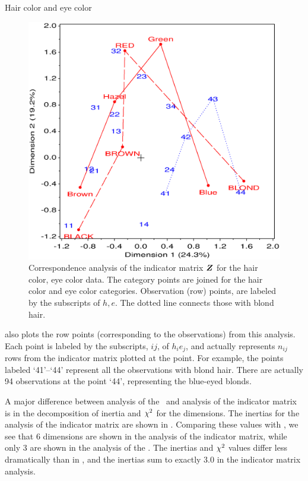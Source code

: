 \begin{Example}[haireye4]{Hair color and eye color}
\begin{figure}[htb]
  \centering
  \includegraphics[scale=.7,clip]{ch5/fig/mcahair}
  \caption[Correspondence
  analysis of the indicator matrix Z for the hair color, eye color data]{Correspondence
  analysis of the indicator matrix $\bm{Z}$ for the hair color, eye color data.
  The category points are joined for the hair color and eye color categories.
  Observation (row) points, are labeled by the subscripts of $h, e$.
  The dotted line connects those with blond hair.}%
  \label{fig:mcahair}
\end{figure}

 also plots the row points (corresponding to the observations) from this analysis.  Each point is labeled by the subscripts,
$ij$, of $h_i e_j$, and actually represents $n_{ij}$ rows
from the indicator matrix
plotted at the point.  For example, the points labeled `41'--`44'
represent all the observations with blond hair.
There are actually 94 observations at the point `44', representing the
blue-eyed blonds.
\end{Example}


A major difference between analysis of the \ctab\ and analysis of the
indicator matrix is in the decomposition of inertia and $\chi^2$
for the dimensions.
The inertias for the analysis of the indicator matrix are shown in
.
Comparing these values with ,
we see that 6 dimensions are shown in the analysis of the indicator matrix,
while only 3 are shown in the analysis of the \ctab.
The inertias and $\chi^2$ values differ less dramatically than
in , and the inertias sum to exactly 3.0 in the
indicator matrix analysis.


